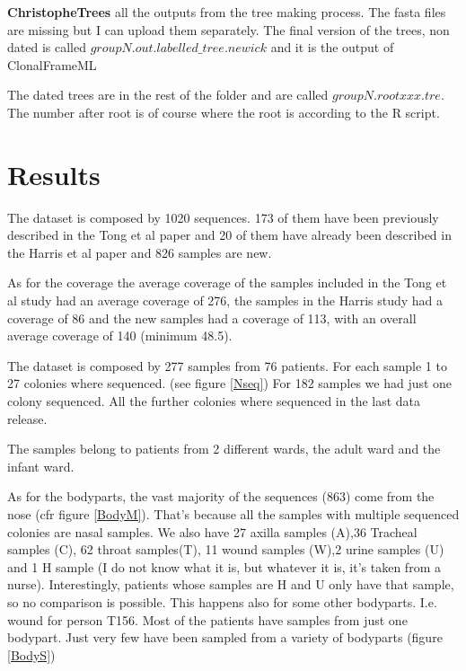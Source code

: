 \documentclass[12pt,a4paper]{article}
\begin{document}
\textbf{ChristopheTrees} all the outputs from the tree making process. The fasta files are missing but I can upload them separately. The final version of the trees, non dated is called $groupN.out.labelled\_tree.newick$ and it is the output of ClonalFrameML

The dated trees are in the rest of the folder and are called $groupN.rootxxx.tre$. The number after root is of course where the root is according to the R script.


\section{Results}
The dataset is composed by 1020 sequences. 173 of them have been previously described in the Tong et al paper and 20 of them have already been described in the Harris et al paper and 826 samples are new. 

As for the coverage the average coverage of the samples included in the Tong et al study had an average coverage of 276, the samples in the Harris study had a coverage of 86 and the new samples had a coverage of 113, with an overall average coverage of 140 (minimum 48.5).

The dataset is composed by 277 samples from 76 patients. For each sample 1 to 27 colonies where sequenced. (see figure \ref{Nseq}) %
For 182 samples we had just one colony sequenced. All the further colonies where sequenced in the last data release.

The samples belong to patients from 2 different wards, the adult ward and the infant ward.

As for the bodyparts, the vast majority of the sequences (863) come from the nose (cfr figure \ref{BodyM}). That's because all the samples with multiple sequenced colonies are nasal samples. We also have 27 axilla samples (A),36 Tracheal samples (C),  62 throat samples(T), 11 wound samples (W),2 urine samples (U) and 1 H sample (I do not know what it is, but whatever it is, it's taken from a nurse). Interestingly, patients whose samples are H and U only have that sample, so no comparison is possible. This happens also for some other bodyparts. I.e. wound for person T156. Most of the patients have samples from just one bodypart. Just very few have been sampled from a variety of bodyparts (figure \ref{BodyS})
\end{document}
